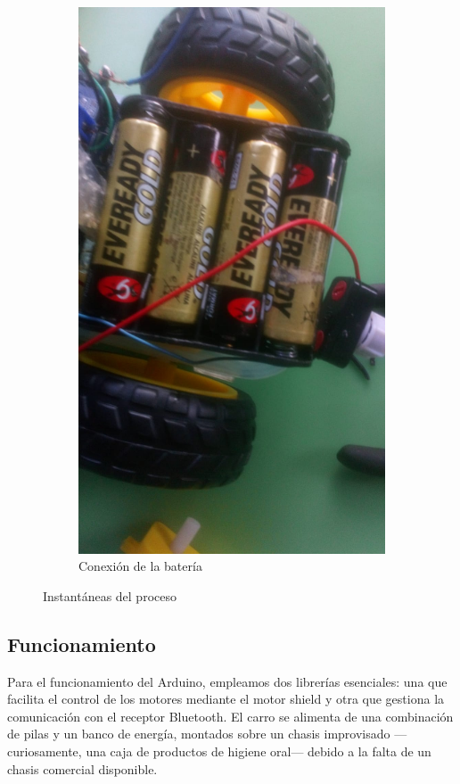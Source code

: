 \begin{figure}[H]
    \begin{subfigure}[b]{0.3\textwidth}
        \centering
        \includegraphics[width=\textwidth]{Figures/0. General/car_controller_1.png}
        \caption{Conexión de la batería}
    \end{subfigure}
    \caption{Instantáneas del proceso}
    \label{fig: tres imágenes}
\end{figure}

\subsection{Funcionamiento}
Para el funcionamiento del Arduino, empleamos dos librerías esenciales: una que facilita el control de los motores mediante el motor shield y otra que gestiona la comunicación con el receptor Bluetooth. El carro se alimenta de una combinación de pilas y un banco de energía, montados sobre un chasis improvisado —curiosamente, una caja de productos de higiene oral— debido a la falta de un chasis comercial disponible.

